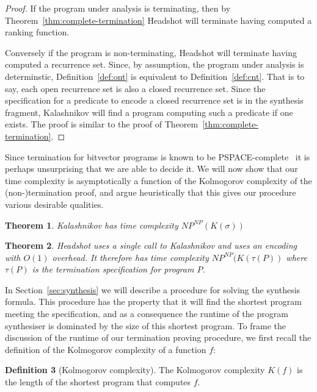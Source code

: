 \documentclass[preprint]{sigplanconf}
\newtheorem{theorem}{Theorem}
\theoremstyle{definition}
\newtheorem{definition}[theorem]{Definition}
\begin{document}
\begin{proof}
 If the program under analysis is terminating, then by Theorem~\ref{thm:complete-termination} {\sc Headshot}
 will terminate having computed a ranking function.

 Conversely if the program is non-terminating, {\sc Headshot} will terminate
 having computed a recurrence set.  Since, by assumption, the program under analysis is determinstic,
 Definition~\ref{def:ont} is equivalent to Definition~\ref{def:cnt}.
 That is to say, each open recurrence set is also a closed recurrence set.  Since the specification for a predicate
 to encode a closed recurrence set is in the synthesis fragment, {\sc Kalashnikov} will find a program computing
 such a predicate if one exists.  The proof is similar to the proof of Theorem~\ref{thm:complete-termination}.
\end{proof}


Since termination for bitvector programs is known to be PSPACE-complete~\cite{DBLP:conf/tacas/CookKRW10} it
is perhaps unsurprising that we are able to decide it.  We will now show that our time complexity is
asymptotically a function of the Kolmogorov complexity of the (non-)termination proof, and argue heuristically
that this gives our procedure various desirable qualities.

\begin{theorem}
 {\sc Kalashnikov} has time complexity $NP^{NP}(K(\sigma))$
\end{theorem}

\begin{theorem}
 {\sc Headshot} uses a single call to {\sc Kalashnikov} and uses an encoding with $O(1)$
 overhead.  It therefore has time complexity $NP^{NP}(K(\tau(P))$ where $\tau(P)$ is the
 termination specification for program $P$.
\end{theorem}


In Section~\ref{sec:synthesis} we will describe a procedure for solving the synthesis formula.
This procedure has the property that it will find the shortest program meeting the
specification, and as a consequence the runtime of the program synthesiser is dominated
by the size of this shortest program.  To frame the discussion of the runtime of our
termination proving procedure, we first recall the definition of the Kolmogorov complexity
of a function $f$:

\begin{definition}[Kolmogorov complexity]
 The Kolmogorov complexity $K(f)$ is the length of the shortest program that
 computes $f$.
\end{definition}
\end{document}
